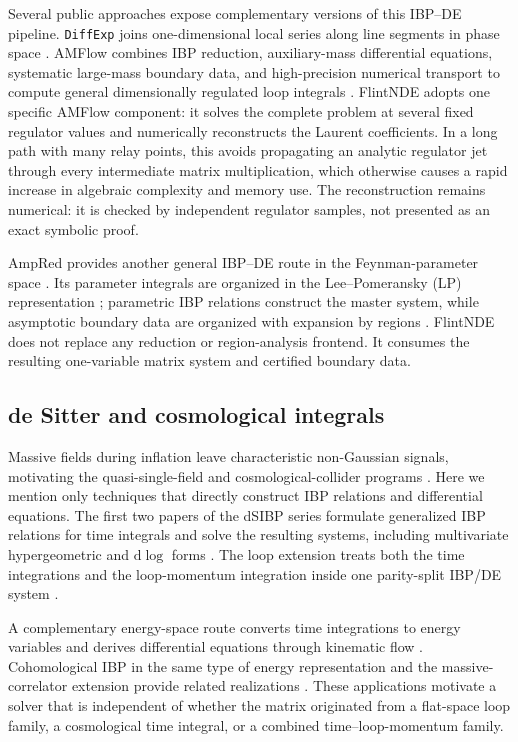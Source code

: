 \documentclass[11pt]{article}
\renewcommand{\_}{\origunderscore\allowbreak}
\begin{document}
Several public approaches expose complementary versions of this IBP--DE pipeline.
\texttt{DiffExp} joins one-dimensional local series along line segments in phase space
\cite{Hidding:2020ytt}.  AMFlow combines IBP reduction, auxiliary-mass differential
equations, systematic large-mass boundary data, and high-precision numerical transport to
compute general dimensionally regulated loop integrals
\cite{Liu:2022chg,Huang:2026rjb}.  FlintNDE adopts
one specific AMFlow component: it solves the complete problem at several fixed regulator
values and numerically reconstructs the Laurent coefficients.  In a long path with many
relay points, this avoids propagating an analytic regulator jet through every intermediate
matrix multiplication, which otherwise causes a rapid increase in algebraic complexity and
memory use.  The reconstruction remains numerical: it is checked by independent regulator
samples, not presented as an exact symbolic proof.

AmpRed provides another general IBP--DE route in the Feynman-parameter space
\cite{Chen:2024xwt}.  Its parameter integrals are organized in the Lee--Pomeransky (LP)
representation \cite{Lee:2013hzt}; parametric IBP relations construct the master system,
while asymptotic boundary data are organized with expansion by regions
\cite{Beneke:1997zp,Pak:2010pt}.  FlintNDE does not replace any reduction or region-analysis
frontend.  It consumes the resulting one-variable matrix system and certified boundary
data.

\subsection{de Sitter and cosmological integrals}

Massive fields during inflation leave characteristic non-Gaussian signals, motivating the
quasi-single-field and cosmological-collider programs
\cite{Chen:2009we,Chen:2009zp,Arkani-Hamed:2015bza}.  Here we mention only techniques that
directly construct IBP relations and differential equations.  The first two papers of the
dSIBP series formulate generalized IBP relations for time integrals and solve the resulting
systems, including multivariate hypergeometric and $\mathrm d\log$ forms
\cite{Chen:2023iix,Chen:2024glu}.  The loop extension treats both the time integrations and
the loop-momentum integration inside one parity-split IBP/DE system
\cite{Chen:2026dqp}.

A complementary energy-space route converts time integrations to energy variables and
derives differential equations through kinematic flow
\cite{Arkani-Hamed:2023kig,Arkani-Hamed:2023bsv}.  Cohomological IBP in the same type of
energy representation and the massive-correlator extension provide related realizations
\cite{De:2023xue,Baumann:2026atn}.  These applications motivate a solver that is independent
of whether the matrix originated from a flat-space loop family, a cosmological time
integral, or a combined time--loop-momentum family.
\end{document}
